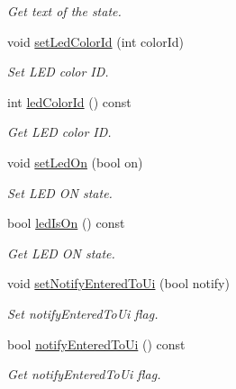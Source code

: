 \begin{DoxyCompactItemize}
\begin{DoxyCompactList}\small\item\em Get text of the state. \end{DoxyCompactList}\item 
void \hyperlink{classmdt_state_a0a8a66a96a1e37cefc4367e3a5d71d8b}{setLedColorId} (int colorId)
\begin{DoxyCompactList}\small\item\em Set LED color ID. \end{DoxyCompactList}\item 
int \hyperlink{classmdt_state_ab75a482b70c27fb0e585fd1c0c343a6d}{ledColorId} () const 
\begin{DoxyCompactList}\small\item\em Get LED color ID. \end{DoxyCompactList}\item 
\hypertarget{classmdt_state_a6e0bb7e259c160209e41af7d31892648}{
void \hyperlink{classmdt_state_a6e0bb7e259c160209e41af7d31892648}{setLedOn} (bool on)}
\label{classmdt_state_a6e0bb7e259c160209e41af7d31892648}

\begin{DoxyCompactList}\small\item\em Set LED ON state. \end{DoxyCompactList}\item 
\hypertarget{classmdt_state_a7daacab2967f6f9ab2c0e156e6295545}{
bool \hyperlink{classmdt_state_a7daacab2967f6f9ab2c0e156e6295545}{ledIsOn} () const }
\label{classmdt_state_a7daacab2967f6f9ab2c0e156e6295545}

\begin{DoxyCompactList}\small\item\em Get LED ON state. \end{DoxyCompactList}\item 
void \hyperlink{classmdt_state_a366f2dac01b3a4150c8966d355ecfba7}{setNotifyEnteredToUi} (bool notify)
\begin{DoxyCompactList}\small\item\em Set notifyEnteredToUi flag. \end{DoxyCompactList}\item 
bool \hyperlink{classmdt_state_a8097cd281438cc58b39b9a195076d841}{notifyEnteredToUi} () const 
\begin{DoxyCompactList}\small\item\em Get notifyEnteredToUi flag. \end{DoxyCompactList}\end{DoxyCompactItemize}



